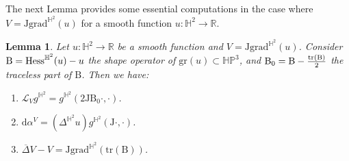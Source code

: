 \documentclass[11pt]{article}
\makeatletter
\DeclareRobustCommand{\mathbbm}[1]{\csname jepbb@#1\endcsname}
\theoremstyle{plain}
\newtheorem{lemma}[cor]{Lemma}
\theoremstyle{definition}
\newcommand{\HP}{\mathbb{HP}^3}
\newcommand{\grad}{\mathrm{grad}^{\mathbb{H}^2}}
\newcommand{\hess}{\mathrm{Hess}^{\mathbb{H}^2}}
\newcommand{\J}{\mathrm{J}}
\newcommand{\B}{\mathrm{B}}
\makeatother
\begin{document}
The next Lemma provides some essential computations in the case where \(V = \J \grad(u) \) for a smooth function \(u : \mathbb{H}^2 \to \mathbb{R} \).
\begin{lemma}\label{Lie_derivative_of_Ju}
Let $u:\mathbb{H}^2\to\mathbb{R}$ be a smooth function and $V=\J\grad(u)$. Consider $\B=\hess(u)-u\mathbbm{1}$ the shape operator of $\mathrm{gr}(u)\subset\HP$, and $\B_0=\B-\frac{\mathrm{tr}(\B)}{2}\mathbbm{1}$ the traceless part of $\B$. Then we have:
\begin{enumerate}
\item \label{1Lie_derivative_of_Ju} $\mathcal{L}_Vg^{\mathbb{H}^2}=g^{\mathbb{H}^2}(2\J\B_0\cdot,\cdot)$.
\item \label{2Lie_derivative_of_Ju} $\mathrm{d}\alpha^V=(\Delta^{\mathbb{H}^2} u) g^{\mathbb{H}^2}(\J\cdot,\cdot)$.
\item \label{3Lie_derivative_of_Ju} $
\overline{\Delta}V-V=\J\grad\left(\mathrm{tr}(\B) \right)$.
\end{enumerate}
\end{lemma}
\end{document}

